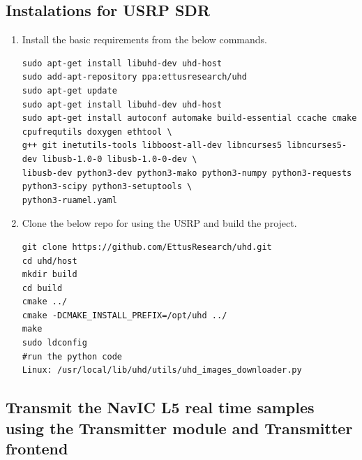 \subsection*{Instalations for USRP SDR}
\begin{enumerate}
\item Install the basic requirements from the below commands. 

\begin{lstlisting}
sudo apt-get install libuhd-dev uhd-host
sudo add-apt-repository ppa:ettusresearch/uhd
sudo apt-get update
sudo apt-get install libuhd-dev uhd-host  
sudo apt-get install autoconf automake build-essential ccache cmake cpufrequtils doxygen ethtool \
g++ git inetutils-tools libboost-all-dev libncurses5 libncurses5-dev libusb-1.0-0 libusb-1.0-0-dev \
libusb-dev python3-dev python3-mako python3-numpy python3-requests python3-scipy python3-setuptools \
python3-ruamel.yaml
\end{lstlisting}
\item Clone the below repo for using the USRP and build the project.
\begin{lstlisting}
git clone https://github.com/EttusResearch/uhd.git
cd uhd/host
mkdir build
cd build
cmake ../
cmake -DCMAKE_INSTALL_PREFIX=/opt/uhd ../
make
sudo ldconfig
#run the python code 
Linux: /usr/local/lib/uhd/utils/uhd_images_downloader.py
\end{lstlisting}

\end{enumerate}

\subsection{Transmit the NavIC L5 real time samples using the Transmitter module and Transmitter frontend}

